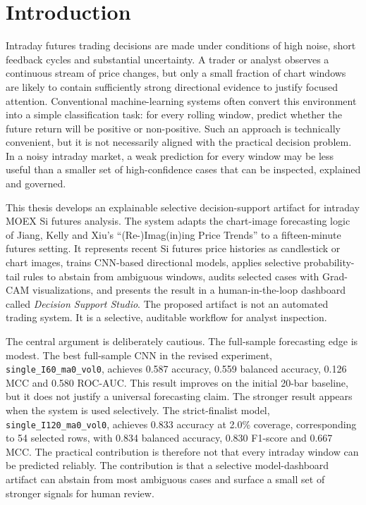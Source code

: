 
\section{Introduction}
\label{sec:introduction}

Intraday futures trading decisions are made under conditions of high noise, short feedback cycles and substantial uncertainty. A trader or analyst observes a continuous stream of price changes, but only a small fraction of chart windows are likely to contain sufficiently strong directional evidence to justify focused attention. Conventional machine-learning systems often convert this environment into a simple classification task: for every rolling window, predict whether the future return will be positive or non-positive. Such an approach is technically convenient, but it is not necessarily aligned with the practical decision problem. In a noisy intraday market, a weak prediction for every window may be less useful than a smaller set of high-confidence cases that can be inspected, explained and governed.

This thesis develops an explainable selective decision-support artifact for intraday MOEX Si futures analysis. The system adapts the chart-image forecasting logic of Jiang, Kelly and Xiu's ``(Re-)Imag(in)ing Price Trends'' \cite{jiang_reimagining_price_trends} to a fifteen-minute futures setting. It represents recent Si futures price histories as candlestick or chart images, trains CNN-based directional models, applies selective probability-tail rules to abstain from ambiguous windows, audits selected cases with Grad-CAM visualizations, and presents the result in a human-in-the-loop dashboard called \emph{Decision Support Studio}. The proposed artifact is not an automated trading system. It is a selective, auditable workflow for analyst inspection.

The central argument is deliberately cautious. The full-sample forecasting edge is modest. The best full-sample CNN in the revised experiment, \texttt{single\_I60\_ma0\_vol0}, achieves 0.587 accuracy, 0.559 balanced accuracy, 0.126 MCC and 0.580 ROC-AUC. This result improves on the initial 20-bar baseline, but it does not justify a universal forecasting claim. The stronger result appears when the system is used selectively. The strict-finalist model, \texttt{single\_I120\_ma0\_vol0}, achieves 0.833 accuracy at 2.0\% coverage, corresponding to 54 selected rows, with 0.834 balanced accuracy, 0.830 F1-score and 0.667 MCC. The practical contribution is therefore not that every intraday window can be predicted reliably. The contribution is that a selective model-dashboard artifact can abstain from most ambiguous cases and surface a small set of stronger signals for human review.

